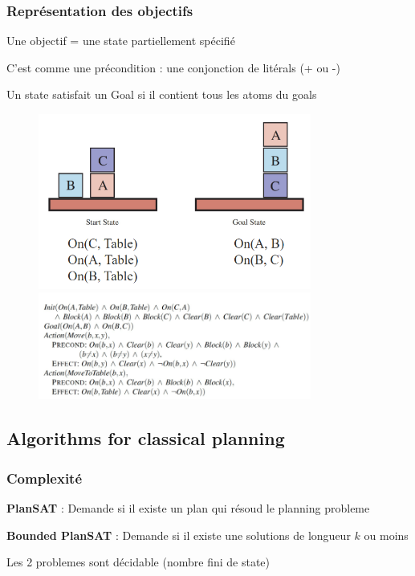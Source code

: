 \documentclass[12pt]{article}
\begin{document}
		\subsubsection{Représentation des objectifs}
			Une objectif = une state partiellement spécifié
			
			C'est comme une précondition : une conjonction de litérals (+ ou -)
			
			Un state satisfait un Goal si il contient tous les atoms du goals
		
			
			\begin{figure}[htp]	
				\centering
				\includegraphics[width=0.8\textwidth]{img/BLOCK.png}
				\includegraphics[width=0.8\textwidth]{img/BLOCK1.png}
			\end{figure}
			 \newpage
			
	\subsection{Algorithms for classical planning}
		\subsubsection{Complexité}
			\textbf{PlanSAT} : Demande si il existe un plan qui résoud le planning probleme
			
			\textbf{Bounded PlanSAT} : Demande si il existe une solutions de longueur $k$ ou moins
			
			Les 2 problemes sont décidable (nombre fini de state)
			
\end{document}
